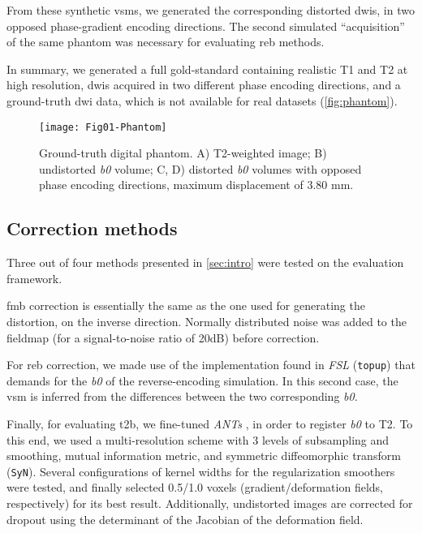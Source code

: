 From these synthetic \glspl*{vsm}, we generated
the corresponding distorted \glspl*{dwi}, in two opposed
phase-gradient encoding directions. The second simulated
``acquisition'' of the same phantom was necessary 
for evaluating \gls*{reb} methods.

In summary, we generated 
a full gold-standard containing realistic T1 and T2
at high resolution, \glspl*{dwi} acquired in two
different phase encoding directions, and a ground-truth
\gls*{dwi} data, which is not available for real datasets
(\autoref{fig:phantom}).


\begin{figure}[thpb]
   \centering
   \texttt{[image: Fig01-Phantom]}
   \caption{Ground-truth digital phantom.
   A) T2-weighted image; B) undistorted \textit{b0} volume;
   C, D) distorted \textit{b0} volumes with opposed phase 
   encoding directions, maximum displacement of 3.80 mm.}
   \label{fig:phantom}
\end{figure}

\subsection{Correction methods}
\label{sec:correction}
Three out of four methods presented in \autoref{sec:intro}
were tested on the evaluation framework. 

\Gls*{fmb} correction
is essentially the same as the one used for generating the 
distortion, on the inverse direction. Normally distributed 
noise was added to the fieldmap (for a signal-to-noise 
ratio of 20dB) before correction.

For \Gls*{reb} correction, we made use of the implementation found 
in \emph{FSL} (\texttt{topup})
that demands for the \textit{b0} of the reverse-encoding simulation.
In this second case, the \gls*{vsm} is inferred from the differences
between the two corresponding \textit{b0}.

Finally, for evaluating \Gls*{t2b},
we fine-tuned \emph{ANTs} \cite{avants_ants:_2013},
in order to register \textit{b0} to T2. To this end, we used a
multi-resolution scheme with 3 levels of subsampling and smoothing,
mutual information metric, and symmetric diffeomorphic transform 
(\texttt{SyN}). Several configurations of kernel widths for the 
regularization smoothers were tested, and finally selected 
0.5/1.0 voxels (gradient/deformation fields, respectively) 
for its best result. Additionally, undistorted images are 
corrected for dropout using the determinant
of the Jacobian of the deformation field.

